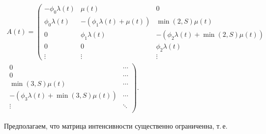         \begin{multline}

            A(t)=       \left(

            \begin{array}{ccc}

                -\phi_0\lambda(t) & \mu(t)  & 0\\[6pt]                                                     

                              \phi_0\lambda(t) & -(\phi_1\lambda(t) + \mu(t)) & \min(2, S)\mu(t)\\[6pt]    

                              0 & \phi_1\lambda(t) & -(\phi_2\lambda(t) + \min(2, S)\mu(t))\\[6pt]         

                              0 & 0 & \phi_2\lambda(t)\\[6pt] 

                \vdots   & \vdots & \vdots                                                         

            \end{array}\right.\\[6pt]

         \left.   \begin{array}{cc}

                   0  & \cdots \\[6pt]                                            

                   0  & \cdots \\[6pt]                                            

                   \min(3, S)\mu(t)    & \cdots \\[6pt]                           

                   -(\phi_3\lambda(t) + \min(3, S)\mu(t)) &  \cdots   \\[6pt]     

                   \vdots    & \ddots \\                                          

            \end{array}

            \right).

            \label{m1}

        \end{multline}      

        Предполагаем, что матрица интенсивности существенно ограниченна, т.\,е.

